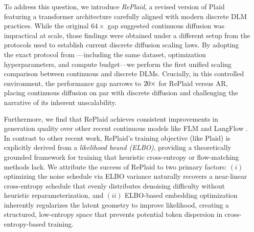 \documentclass{article}
\begin{document}
%

To address this question, we introduce \textit{RePlaid}, a revised version of Plaid featuring a transformer architecture carefully aligned with modern discrete DLM practices. While the original $64\times$ gap suggested continuous diffusion was impractical at scale, those findings were obtained under a different setup from the protocols used to establish current discrete diffusion scaling laws. By adopting the exact protocol from \citet{sahoo2026scaling}---including the same dataset, optimization hyperparameters, and compute budget---we perform the first unified scaling comparison between continuous and discrete DLMs. Crucially, in this controlled environment, the performance gap narrows to $20\times$ for RePlaid versus AR, placing continuous diffusion on par with discrete diffusion and challenging the narrative of its inherent unscalability.

Furthermore, we find that RePlaid achieves consistent improvements in generation quality over other recent continuous models like FLM \cite{lee2026flow} and LangFlow \cite{chen2026langflow}. In contrast to other recent work, RePlaid's training objective (like Plaid) is explicitly derived from a \textit{likelihood bound (ELBO)}, providing a theoretically grounded framework for training that heuristic cross-entropy or flow-matching methods lack. We attribute the success of RePlaid to two primary factors: $(i)$ optimizing the noise schedule via ELBO variance naturally recovers a near-linear cross-entropy schedule that evenly distributes denoising difficulty without heuristic reparameterization, and $(ii)$ ELBO-based embedding optimization inherently regularizes the latent geometry to improve likelihood, creating a structured, low-entropy space that prevents potential token dispersion in cross-entropy-based training.




%




%

%

%

%







%

%

%

%

%
%
%
%
%
%
%

%
\end{document}
